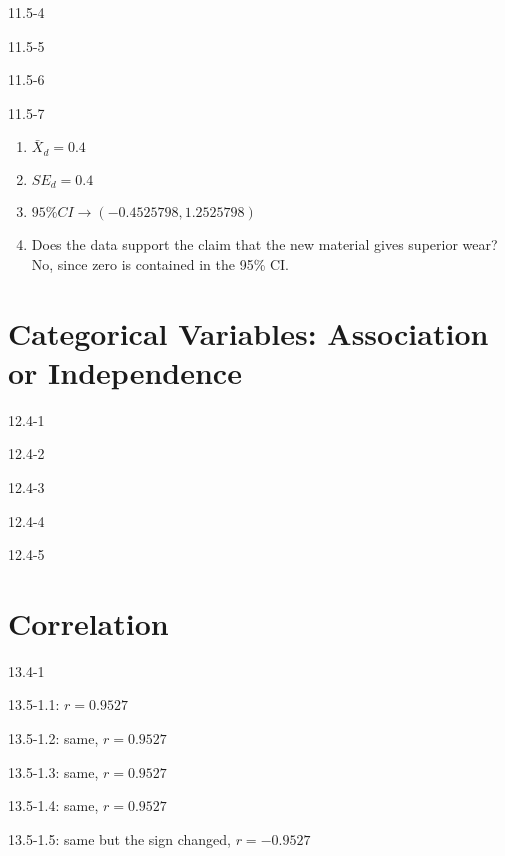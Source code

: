 \begin{exsol@solution}{11.5-4}

\end{exsol@solution}
\begin{exsol@solution}{11.5-5}
\end{exsol@solution}
\begin{exsol@solution}{11.5-6}
\end{exsol@solution}
\begin{exsol@solution}{11.5-7}


\begin{enumerate}
  \item $\bar{X}_d = 0.4 $
  \item $SE_d = 0.4$
  \item $95\% CI  \rightarrow ( -0.4525798, 1.2525798 )$
  \item Does the data support the claim that the new material gives superior wear?  No, since zero is contained in the 95\% CI.
\end{enumerate}

\end{exsol@solution}
\setcounter{chapter}{12}\chapter{Categorical Variables: Association or Independence}
\begin{exsol@solution}{12.4-1}
\end{exsol@solution}
\begin{exsol@solution}{12.4-2}
\end{exsol@solution}
\begin{exsol@solution}{12.4-3}
\end{exsol@solution}
\begin{exsol@solution}{12.4-4}
\end{exsol@solution}
\begin{exsol@solution}{12.4-5}
\end{exsol@solution}
\setcounter{chapter}{13}\chapter{Correlation}
\begin{exsol@solution}{13.4-1}


13.5-1.1: $r = 0.9527 $

13.5-1.2: same, $r = 0.9527 $

13.5-1.3: same, $r = 0.9527 $

13.5-1.4: same, $r = 0.9527 $

13.5-1.5: same but the sign changed, $r = -0.9527 $

\end{exsol@solution}
